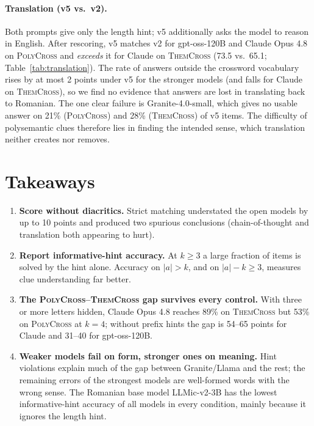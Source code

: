 \documentclass{article}
\newif\ifllmic\llmictrue
\newcommand{\poly}{\textsc{PolyCross}}
\newcommand{\them}{\textsc{ThemCross}}
\newcommand{\tabsize}{\small\setlength{\tabcolsep}{3.2pt}}
\begin{document}
\paragraph{Translation (v5 vs.\ v2).} Both prompts give only the length hint; v5 additionally asks the
model to reason in English. After rescoring, v5 matches v2 for gpt-oss-120B and Claude Opus 4.8 on
\poly{} and \emph{exceeds} it for Claude on \them{} (73.5 vs.\ 65.1; Table~\ref{tab:translation}).
The rate of answers outside the crossword vocabulary rises by at most 2 points under v5 for the
stronger models (and falls for Claude on \them{}), so we find no evidence that answers are lost in translating back to Romanian. The one clear failure is
Granite-4.0-small, which gives no usable answer on 21\% (\poly{}) and 28\% (\them{}) of v5 items.
The difficulty of polysemantic clues therefore lies in finding the intended sense, which translation
neither creates nor removes.

\begin{table}[!htb]
\centering\tabsize
\caption{Translate (v5) vs.\ length hint (v2), \%. No ans.: empty or unparseable. OOV (out of vocabulary): answered with a word that is not an
answer anywhere in either full corpus (an over-estimate because of inflected forms; compare columns
rather than read absolute values). Len.\ ok: answer has the given length.}
\label{tab:translation}

\end{table}

\section{Takeaways}
\label{sec:takeaways}

\begin{enumerate}
\item \textbf{Score without diacritics.} Strict matching understated the open models by up to 10 points
      and produced two spurious conclusions (chain-of-thought and translation both appearing to hurt).
\item \textbf{Report informative-hint accuracy.} At $k{\ge}3$ a large fraction of items is solved by
      the hint alone. Accuracy on $|a|>k$, and on $|a|-k\ge3$, measures clue understanding far better.
\item \textbf{The \poly{}--\them{} gap survives every control.} With three or more letters hidden,
      Claude Opus 4.8 reaches 89\% on \them{} but 53\% on \poly{} at $k{=}4$; without prefix hints the
      gap is 54--65 points for Claude and 31--40 for gpt-oss-120B.
\item \textbf{Weaker models fail on form, stronger ones on meaning.} Hint violations explain much of the
      gap between Granite/Llama and the rest; the remaining errors of the strongest models are
      well-formed words with the wrong sense.\ifllmic{} The Romanian base model LLMic-v2-3B has the
      lowest informative-hint accuracy of all models in every condition, mainly because it ignores
      the length hint.\fi
\end{enumerate}
\end{document}
